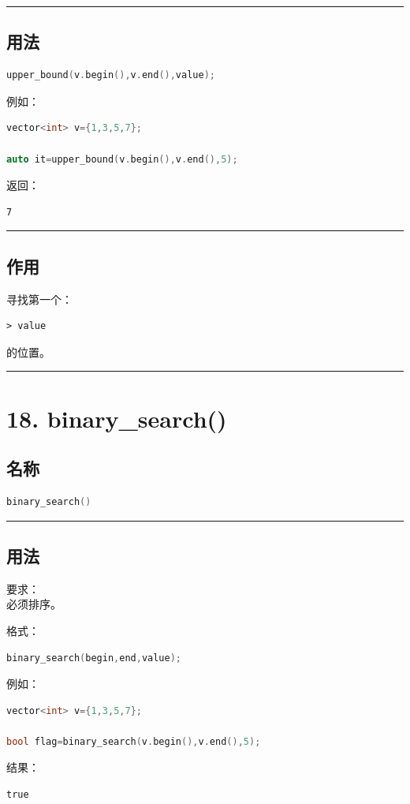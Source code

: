 \documentclass[10pt,twocolumn]{extarticle}
\begin{document}
\noindent\rule{\linewidth}{0.4pt}

\subsection{用法}
\begin{lstlisting}[language=C++]
upper_bound(v.begin(),v.end(),value);
\end{lstlisting}
例如：
\begin{lstlisting}[language=C++]
vector<int> v={1,3,5,7};

auto it=upper_bound(v.begin(),v.end(),5);
\end{lstlisting}
返回：
\begin{lstlisting}
7
\end{lstlisting}

\noindent\rule{\linewidth}{0.4pt}

\subsection{作用}
寻找第一个：
\begin{lstlisting}
> value
\end{lstlisting}
的位置。

\noindent\rule{\linewidth}{0.4pt}

\section{18. binary\_search()}

\subsection{名称}
\begin{lstlisting}[language=C++]
binary_search()
\end{lstlisting}

\noindent\rule{\linewidth}{0.4pt}

\subsection{用法}
要求：\\
必须排序。

格式：
\begin{lstlisting}[language=C++]
binary_search(begin,end,value);
\end{lstlisting}
例如：
\begin{lstlisting}[language=C++]
vector<int> v={1,3,5,7};

bool flag=binary_search(v.begin(),v.end(),5);
\end{lstlisting}
结果：
\begin{lstlisting}
true
\end{lstlisting}
\end{document}
